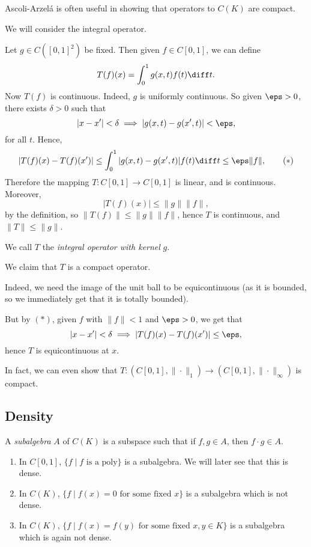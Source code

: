 \documentclass[12pt]{article}
\begin{document}
Ascoli-Arzel\'a is often useful in showing that operators to $C(K)$ are compact.

\begin{exbox}
	We will consider the integral operator.

	Let $g \in C([0,1]^2)$ be fixed. Then given $f \in C[0,1]$, we can define
	\[
	T(f)(x) = \int_0^1 g(x, t)f(t) \diff t.
	\]
	Now $T(f)$ is continuous. Indeed, $g$ is uniformly continuous. So given $\eps > 0$, there exists $\delta > 0$ such that
	\[
	|x - x'| < \delta \implies |g(x,t) - g(x', t)| < \eps,
	\]
	for all $t$. Hence,
	\[
		|T(f)(x) - T(f)(x')| \leq \int_0^1 |g(x, t) - g(x',t)|f(t) \diff t \leq \eps \|f\|, \tag{$\ast$}
	\]
	Therefore the mapping $T : C[0,1] \to C[0,1]$ is linear, and is continuous. Moreover,
	\[
	|T(f)(x)| \leq \|g\|\|f\|,
	\]
	by the definition, so $\|T(f)\| \leq \|g\|\|f\|$, hence $T$ is continuous, and $\|T\| \leq \|g\|$.

	We call $T$ the \emph{integral operator with kernel} $g$.

	We claim that $T$ is a compact operator.

	Indeed, we need the image of the unit ball to be equicontinuous (as it is bounded, so we immediately get that it is totally bounded).

	But by $(\ast)$, given $f$ with $\|f\| < 1$ and $\eps > 0$, we get that
	\[
	|x - x'| < \delta \implies |T(f)(x) - T(f)(x')| \leq \eps,
	\]
	hence $T$ is equicontinuous at $x$.

	In fact, we can even show that $T : (C[0, 1], \|\cdot\|_1) \to (C[0,1], \|\cdot\|_\infty)$ is compact.
\end{exbox}

\subsection{Density}
\label{sub:density}

A \emph{subalgebra} $A$ of $C(K)$ is a subspace such that if $f, g \in A$, then $f \cdot g \in A$.

\begin{exbox}
	\begin{enumerate}
		\item In $C[0,1]$, $\{f \mid f \text{ is a poly}\}$ is a subalgebra. We will later see that this is dense.
		\item In $C(K)$, $\{f \mid f(x) = 0 \text{ for some fixed } x\}$ is a subalgebra which is not dense.
		\item In $C(K)$, $\{f \mid f(x) = f(y) \text{ for some fixed } x, y \in K\}$ is a subalgebra which is again not dense.
	\end{enumerate}
\end{exbox}
\end{document}
